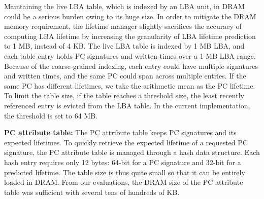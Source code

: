 Maintaining the live LBA table, which is indexed by an LBA unit,
in DRAM could be a serious burden owing to its
huge size. In order to mitigate the DRAM memory requirement, 
the lifetime manager slightly sacrifices
the accuracy of computing LBA lifetime by increasing the 
granularity of LBA lifetime prediction to 1 MB, instead of 4 KB.  The
live LBA table is indexed by 1 MB LBA, and each table entry holds PC
signatures and written times over a 1-MB LBA range. 
Because of the coarse-grained indexing, each entry
could have multiple signatures and written times, and the same PC could span
across multiple entries.  If the same PC has different lifetimes, we take the
arithmetic mean as the PC lifetime. 
To limit the table size, if the table reaches a
threshold size, the least recently referenced entry is evicted from 
the LBA table.
In the current implementation, the threshold is set to 64 MB.

\textbf{PC attribute table:}
The PC attribute table keeps PC signatures and its expected lifetimes. To quickly
retrieve the expected lifetime of a requested PC signature, 
the PC attribute table is managed
through a hash data structure. Each hash entry requires only 12 bytes: 64-bit
for a PC signature and 32-bit for a predicted lifetime.  The table size is thus
quite small so that it can be entirely loaded in DRAM. 
From our evaluations, the DRAM size of the PC attribute table was sufficient 
with several tens of hundreds of KB.

